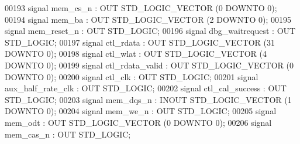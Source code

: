\begin{DoxyCode}
00193         \textcolor{keywordflow}{signal} mem_cs_n : \textcolor{keywordflow}{OUT} \textcolor{comment}{STD\_LOGIC\_VECTOR} (\textcolor{vhdllogic}{}\textcolor{vhdllogic}{0} \textcolor{keywordflow}{DOWNTO} \textcolor{vhdllogic}{}\textcolor{vhdllogic}{0});
00194         \textcolor{keywordflow}{signal} mem_ba : \textcolor{keywordflow}{OUT} \textcolor{comment}{STD\_LOGIC\_VECTOR} (\textcolor{vhdllogic}{}\textcolor{vhdllogic}{2} \textcolor{keywordflow}{DOWNTO} \textcolor{vhdllogic}{}\textcolor{vhdllogic}{0});
00195         \textcolor{keywordflow}{signal} mem_reset_n : \textcolor{keywordflow}{OUT} \textcolor{comment}{STD\_LOGIC};
00196         \textcolor{keywordflow}{signal} dbg_waitrequest : \textcolor{keywordflow}{OUT} \textcolor{comment}{STD\_LOGIC};
00197         \textcolor{keywordflow}{signal} ctl_rdata : \textcolor{keywordflow}{OUT} \textcolor{comment}{STD\_LOGIC\_VECTOR} (\textcolor{vhdllogic}{}\textcolor{vhdllogic}{31} \textcolor{keywordflow}{DOWNTO} \textcolor{vhdllogic}{}\textcolor{vhdllogic}{0});
00198         \textcolor{keywordflow}{signal} ctl_wlat : \textcolor{keywordflow}{OUT} \textcolor{comment}{STD\_LOGIC\_VECTOR} (\textcolor{vhdllogic}{}\textcolor{vhdllogic}{4} \textcolor{keywordflow}{DOWNTO} \textcolor{vhdllogic}{}\textcolor{vhdllogic}{0});
00199         \textcolor{keywordflow}{signal} ctl_rdata_valid : \textcolor{keywordflow}{OUT} \textcolor{comment}{STD\_LOGIC\_VECTOR} (\textcolor{vhdllogic}{}\textcolor{vhdllogic}{0} \textcolor{keywordflow}{DOWNTO} \textcolor{vhdllogic}{}\textcolor{vhdllogic}{0});
00200         \textcolor{keywordflow}{signal} ctl_clk : \textcolor{keywordflow}{OUT} \textcolor{comment}{STD\_LOGIC};
00201         \textcolor{keywordflow}{signal} aux_half_rate_clk : \textcolor{keywordflow}{OUT} \textcolor{comment}{STD\_LOGIC};
00202         \textcolor{keywordflow}{signal} ctl_cal_success : \textcolor{keywordflow}{OUT} \textcolor{comment}{STD\_LOGIC};
00203         \textcolor{keywordflow}{signal} mem_dqs_n : \textcolor{keywordflow}{INOUT} \textcolor{comment}{STD\_LOGIC\_VECTOR} (\textcolor{vhdllogic}{}\textcolor{vhdllogic}{1} \textcolor{keywordflow}{DOWNTO} \textcolor{vhdllogic}{}\textcolor{vhdllogic}{0});
00204         \textcolor{keywordflow}{signal} mem_we_n : \textcolor{keywordflow}{OUT} \textcolor{comment}{STD\_LOGIC};
00205         \textcolor{keywordflow}{signal} mem_odt : \textcolor{keywordflow}{OUT} \textcolor{comment}{STD\_LOGIC\_VECTOR} (\textcolor{vhdllogic}{}\textcolor{vhdllogic}{0} \textcolor{keywordflow}{DOWNTO} \textcolor{vhdllogic}{}\textcolor{vhdllogic}{0});
00206         \textcolor{keywordflow}{signal} mem_cas_n : \textcolor{keywordflow}{OUT} \textcolor{comment}{STD\_LOGIC};

\end{DoxyCode}
